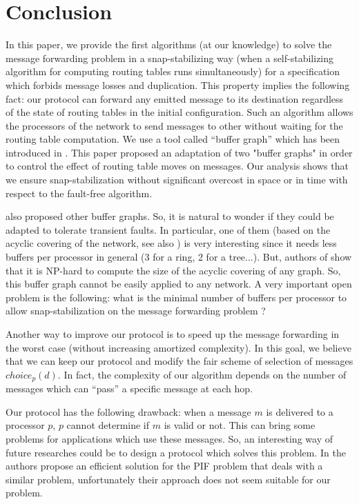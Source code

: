 \documentclass[11pt]{article}
\begin{document}
\section{Conclusion}\label{sec:Conclusion}

In this paper, we provide the first algorithms (at our knowledge) to solve the message forwarding problem in a snap-stabilizing way (when a self-stabilizing algorithm for computing routing tables runs simultaneously) for a specification which forbids message losses and duplication. This property implies the following fact: our protocol can forward any emitted message to its destination regardless of the state of routing tables in the initial configuration. Such an algorithm allows the processors of the network to send messages to other without waiting for the routing table computation. We use a tool called ``buffer graph'' which has been introduced in \cite{MS78}. This paper proposed an adaptation of two "buffer graphs" in order to control the effect of routing table moves on messages. Our analysis shows that we ensure snap-stabilization without significant overcost in space or in time with respect to the fault-free algorithm.

\cite{MS78} also proposed other buffer graphs. So, it is natural to wonder if they could be adapted to tolerate transient faults. In particular, one of them (based on the acyclic covering of the network, see also \cite{T01}) is very interesting since it needs less buffers per processor in general (3 for a ring, 2 for a tree...). But, authors of \cite{KR07} show that it is NP-hard to compute the size of the acyclic covering of any graph. So, this buffer graph cannot be easily applied to any network. A very important open problem is the following: what is the minimal number of buffers per processor to allow snap-stabilization on the message forwarding problem ?

Another way to improve our protocol is to speed up the message forwarding in the worst case (without increasing amortized complexity). In this goal, we believe that we can keep our protocol and modify the fair scheme of selection of messages $choice_{p}(d)$. In fact, the complexity of our algorithm depends on the number of messages which can ``pass'' a specific message at each hop.

Our protocol has the following drawback: when a message $m$ is delivered to a processor $p$, $p$ cannot determine if $m$ is valid or not. This can bring some problems for applications which use these messages. So, an interesting way of future researches could be to design a protocol which solves this problem. In \cite{CDV06} the authors propose an efficient solution for the PIF problem that deals with a similar problem, unfortunately their approach does not seem suitable for our problem.
\end{document}
